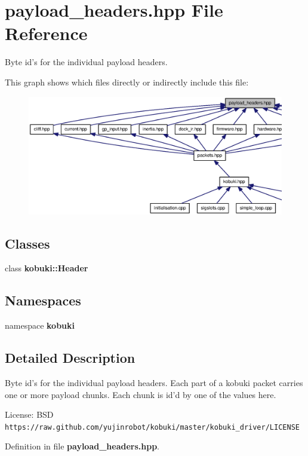 \section{payload\-\_\-headers.\-hpp \-File \-Reference}
\label{payload__headers_8hpp}


\-Byte id's for the individual payload headers.  


\-This graph shows which files directly or indirectly include this file\-:
\nopagebreak
\begin{figure}[H]
\begin{center}
\leavevmode
\includegraphics[width=350pt]{payload__headers_8hpp__dep__incl}
\end{center}
\end{figure}
\subsection*{\-Classes}
\begin{DoxyCompactItemize}
\item 
class {\bf kobuki\-::\-Header}
\end{DoxyCompactItemize}
\subsection*{\-Namespaces}
\begin{DoxyCompactItemize}
\item 
namespace {\bf kobuki}
\end{DoxyCompactItemize}


\subsection{\-Detailed \-Description}
\-Byte id's for the individual payload headers. \-Each part of a kobuki packet carries one or more payload chunks. \-Each chunk is id'd by one of the values here.

\-License\-: \-B\-S\-D {\tt https\-://raw.\-github.\-com/yujinrobot/kobuki/master/kobuki\-\_\-driver/\-L\-I\-C\-E\-N\-S\-E} 

\-Definition in file {\bf payload\-\_\-headers.\-hpp}.

